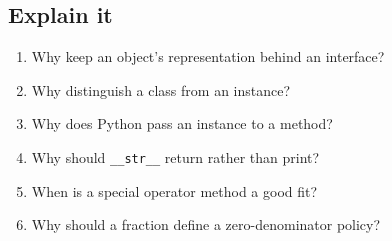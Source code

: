 \documentclass[11pt]{article}
\begin{document}
\begin{keepsection}
\section{Explain it}

\begin{enumerate}
\item Why keep an object’s representation behind an interface?
\item Why distinguish a class from an instance?
\item Why does Python pass an instance to a method?
\item Why should \texttt{\_\_str\_\_} return rather than print?
\item When is a special operator method a good fit?
\item Why should a fraction define a zero-denominator policy?
\end{enumerate}

\end{keepsection}

\clearpage
\end{document}
